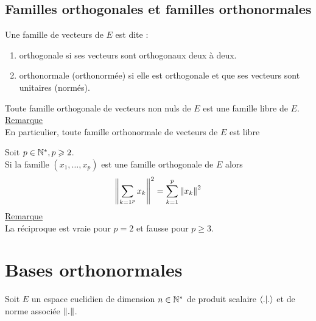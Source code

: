 \subsection{Familles orthogonales et familles orthonormales}
\begin{defi}
    Une famille de vecteurs de \(E\) est dite :
    \begin{enumerate}
        \item orthogonale si ses vecteurs sont orthogonaux deux à deux.
        \item orthonormale (orthonormée) si elle est orthogonale et que ses vecteurs sont unitaires (normés).
    \end{enumerate}
\end{defi}
\begin{defprop}
    Toute famille orthogonale de vecteurs non nuls de \(E\) est une famille libre de \(E\).\\
    \underline{Remarque}\\
    En particulier, toute famille orthonormale de vecteurs de \(E\) est libre
\end{defprop}
\begin{theo}
    Soit \(p \in \mathbb{N}^*, p \geqslant 2\).\\
    Si la famille \((x_1, \dots , x_p)\) est une famille orthogonale de \(E\) alors
    \[\left\|\sum_{k=1^p} x_k\right\|^2 = \sum_{k=1}^p\left\|x_k\right\|^2\]
    \underline{Remarque}\\
    La réciproque est vraie pour \(p = 2\) et fausse pour \(p \geq 3\).
\end{theo}
\section{Bases orthonormales}
    Soit \(E\) un espace euclidien de dimension \(n \in \mathbb{N}^*\) de produit scalaire \(\langle . | . \rangle\) et de norme associée \(\left\|.\right\|\).

